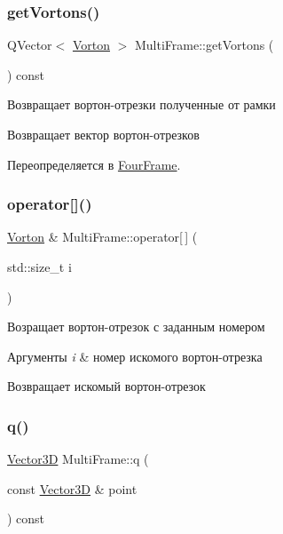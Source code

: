 \subsubsection{\texorpdfstring{get\+Vortons()}{getVortons()}}
{\footnotesize\ttfamily Q\+Vector$<$ \mbox{\hyperlink{class_vorton}{Vorton}} $>$ Multi\+Frame\+::get\+Vortons (\begin{DoxyParamCaption}{ }\end{DoxyParamCaption}) const\hspace{0.3cm}{\ttfamily [virtual]}}

Возвращает вортон-\/отрезки полученные от рамки \begin{DoxyReturn}{Возвращает}
вектор вортон-\/отрезков 
\end{DoxyReturn}


Переопределяется в \mbox{\hyperlink{class_four_frame_a52bff30c98e07de59f17234fc5af03e0}{Four\+Frame}}.

\mbox{\label{class_multi_frame_ad2dbc878f956dcf3301c6a7138411e6c}} 
\subsubsection{\texorpdfstring{operator[]()}{operator[]()}}
{\footnotesize\ttfamily \mbox{\hyperlink{class_vorton}{Vorton}} \& Multi\+Frame\+::operator\mbox{[}$\,$\mbox{]} (\begin{DoxyParamCaption}\item[{std\+::size\+\_\+t}]{i }\end{DoxyParamCaption})\hspace{0.3cm}{\ttfamily [virtual]}}

Возращает вортон-\/отрезок с заданным номером 
\begin{DoxyParams}{Аргументы}
{\em i} & номер искомого вортон-\/отрезка \\
\hline
\end{DoxyParams}
\begin{DoxyReturn}{Возвращает}
искомый вортон-\/отрезок 
\end{DoxyReturn}
\mbox{\label{class_multi_frame_a7bc27f76622612b9ccef915c848e492d}} 
\subsubsection{\texorpdfstring{q()}{q()}}
{\footnotesize\ttfamily \mbox{\hyperlink{class_vector3_d}{Vector3D}} Multi\+Frame\+::q (\begin{DoxyParamCaption}\item[{const \mbox{\hyperlink{class_vector3_d}{Vector3D}} \&}]{point }\end{DoxyParamCaption}) const\hspace{0.3cm}{\ttfamily [virtual]}}

